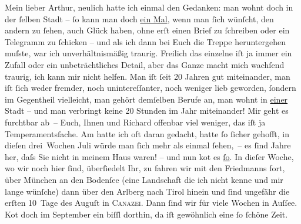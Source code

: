 \pstart{}Mein lieber Arthur,\pend\vspace{0.5em}
\pstart
           neulich hatte ich einmal den Gedanken: man wohnt doch in der{ }ſelben Stadt –{ }ſo kann
               man doch \uline{ein Mal}, wenn man{ }ſich wünſcht, den andern
               zu{ }ſehen, auch Glück haben, ohne erſt einen Brief zu{ }ſchreiben oder ein Telegramm zu{ }ſchicken – und als ich dann bei Euch die Treppe heruntergehen {\pb}muſste, war ich unverhältnismäßig
               traurig. Freilich das einzelne iſt ja immer ein Zufall oder ein unbeträchtliches
               Detail, aber das Ganze macht mich wachſend traurig, ich kann mir nicht helfen. Man
               iſt{ }ſeit 20 Jahren gut miteinander, man iſt{ }ſich weder fremder, noch unintereſſanter,
               noch weniger lieb geworden, {\pb}ſondern im Gegentheil vielleicht, man gehört demſelben Berufe an, man wohnt in \uline{einer} Stadt – und man verbringt keine 20 Stunden im
               Jahr miteinander! Mir geht es furchtbar ab – Euch, Ihnen und Richard offenbar viel weniger, das iſt ja Temperamentsſache. Am
                  \label{K_L01947-1v}\label{K_L01947-1}{ }{\pb}hatte ich oft daran gedacht,
               hatte{ }ſo{ }ſicher gehofft, in dieſen drei Wochen Juli würde man{ }ſich mehr
               als einmal{ }ſehen, – es{ }ſind Jahre her, daſs Sie nicht in meinem Haus waren! – und nun ko{\geminationm}t es \uline{ſo}. In dieſer
               Woche, wo wir noch hier{ }ſind,  überſiedelt Ihr,
               zu \label{K_L01947-2v}\label{K_L01947-2} fahren wir mit {\pb}den
                  Friedmanns fort, über München an den Bodenſee (eine Landschaft die ich nicht kenne und mir lange wünſche) dann
               über den Arlberg nach Tirol hinein und{ }ſind ungefähr die erſten 10 Tage des
                  Auguſt in \textsc{Canazei}. Dann{ }ſind wir für viele Wochen {\pb}in Auſſee. Ko{\geminationm}t doch im September ein
               biſſl dorthin, da iſt gewöhnlich eine{ }ſo{ }ſchöne Zeit.\pend
           
